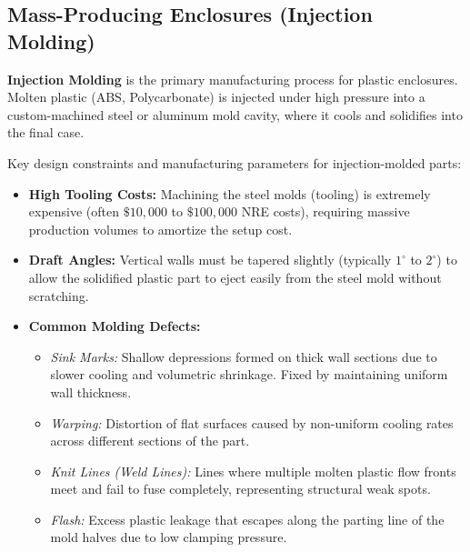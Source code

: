 \documentclass[12pt,a4paper]{article}
\begin{document}
\subsection{Mass-Producing Enclosures (Injection Molding)}
\begin{tcolorbox}[defbox, title={Injection Molding}]
  \textbf{Injection Molding} is the primary manufacturing process for plastic enclosures. Molten plastic (ABS, Polycarbonate) is injected under high pressure into a custom-machined steel or aluminum mold cavity, where it cools and solidifies into the final case.
\end{tcolorbox}
Key design constraints and manufacturing parameters for injection-molded parts:
\begin{itemize}[leftmargin=*, itemsep=3.0pt]
  \item \textbf{High Tooling Costs:} Machining the steel molds (tooling) is extremely expensive (often $\$10,000$ to $\$100,000$ NRE costs), requiring massive production volumes to amortize the setup cost.
  \item \textbf{Draft Angles:} Vertical walls must be tapered slightly (typically $1^\circ$ to $2^\circ$) to allow the solidified plastic part to eject easily from the steel mold without scratching.
  \item \textbf{Common Molding Defects:}
        \begin{itemize}[leftmargin=*, label=$\bullet$, itemsep=1.5pt]
          \item \textit{Sink Marks:} Shallow depressions formed on thick wall sections due to slower cooling and volumetric shrinkage. Fixed by maintaining uniform wall thickness.
          \item \textit{Warping:} Distortion of flat surfaces caused by non-uniform cooling rates across different sections of the part.
          \item \textit{Knit Lines (Weld Lines):} Lines where multiple molten plastic flow fronts meet and fail to fuse completely, representing structural weak spots.
          \item \textit{Flash:} Excess plastic leakage that escapes along the parting line of the mold halves due to low clamping pressure.
        \end{itemize}
\end{itemize}
\end{document}
